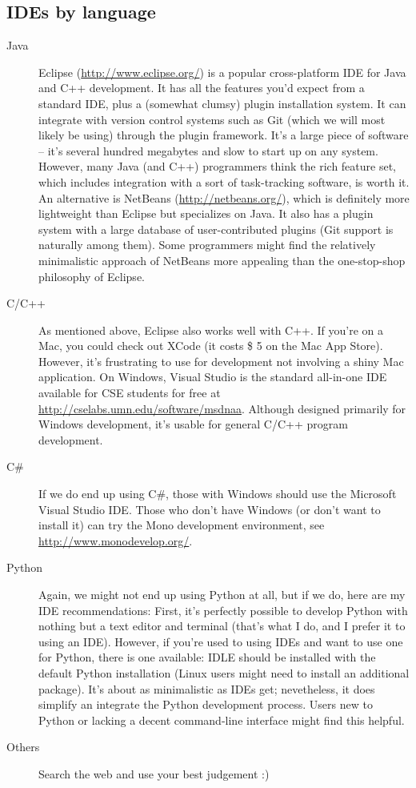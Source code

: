 \documentclass{article}
\begin{document}
\subsection{IDEs by language}
\begin{description}
    \item[Java]
        Eclipse (\url{http://www.eclipse.org/}) is a popular cross-platform IDE for Java and C++ development. It has all the features you'd expect from a standard IDE, plus a (somewhat clumsy) plugin installation system. It can integrate with version control systems such as Git (which we will most likely be using) through the plugin framework. It's a large piece of software -- it's several hundred megabytes and slow to start up on any system. However, many Java (and C++) programmers think the rich feature set, which includes integration with a sort of task-tracking software, is worth it. An alternative is NetBeans (\url{http://netbeans.org/}), which is definitely more lightweight than Eclipse but specializes on Java. It also has a plugin system with a large database of user-contributed plugins (Git support is naturally among them). Some programmers might find the relatively minimalistic approach of NetBeans more appealing than the one-stop-shop philosophy of Eclipse.
    \item[C/C++]
        As mentioned above, Eclipse also works well with C++. If you're on a Mac, you could check out XCode (it costs \$ 5 on the Mac App Store). However, it's frustrating to use for development not involving a shiny Mac application. On Windows, Visual Studio is the standard all-in-one IDE available for CSE students for free at \url{http://cselabs.umn.edu/software/msdnaa}. Although designed primarily for Windows development, it's usable for general C/C++ program development.
    \item[C\#]
        If we do end up using C\#, those with Windows should use the Microsoft Visual Studio IDE. Those who don't have Windows (or don't want to install it) can try the Mono development environment, see \url{http://www.monodevelop.org/}. 
    \item[Python]
        Again, we might not end up using Python at all, but if we do, here are my IDE recommendations: First, it's perfectly possible to develop Python with nothing but a text editor and terminal (that's what I do, and I prefer it to using an IDE). However, if you're used to using IDEs and want to use one for Python, there is one available: IDLE should be installed with the default Python installation (Linux users might need to install an additional package). It's about as minimalistic as IDEs get; nevetheless, it does simplify an integrate the Python development process. Users new to Python or lacking a decent command-line interface might find this helpful.
    \item[Others]
        Search the web and use your best judgement :)
\end{description}
\end{document}
